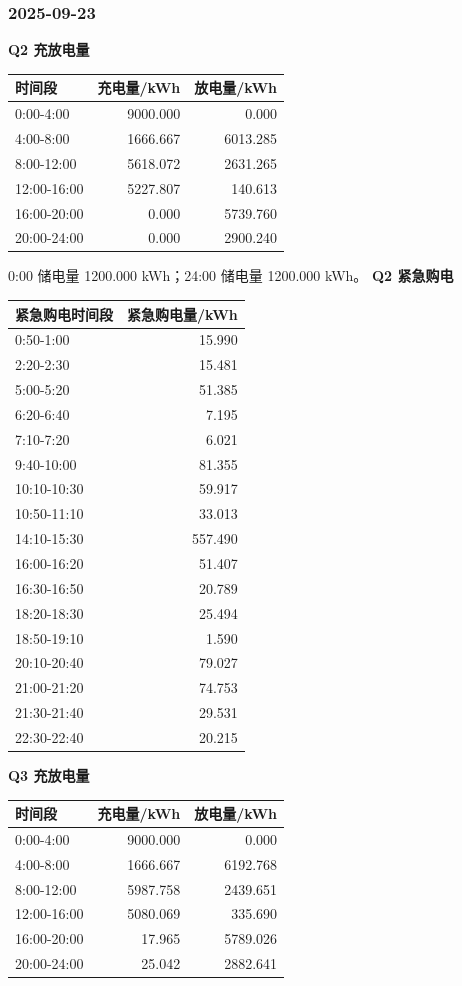 \subsubsection{2025-09-23}
\textbf{Q2 充放电量}
\begin{longtable}[]{@{}lrr@{}}\toprule 时间段 & 充电量/kWh & 放电量/kWh \\\midrule\endhead
0:00-4:00 & 9000.000 & 0.000 \\
4:00-8:00 & 1666.667 & 6013.285 \\
8:00-12:00 & 5618.072 & 2631.265 \\
12:00-16:00 & 5227.807 & 140.613 \\
16:00-20:00 & 0.000 & 5739.760 \\
20:00-24:00 & 0.000 & 2900.240 \\
\bottomrule\end{longtable}
0:00 储电量 1200.000 kWh；24:00 储电量 1200.000 kWh。
\textbf{Q2 紧急购电}
\begin{longtable}[]{@{}lr@{}}\toprule 紧急购电时间段 & 紧急购电量/kWh \\\midrule\endhead
0:50-1:00 & 15.990 \\
2:20-2:30 & 15.481 \\
5:00-5:20 & 51.385 \\
6:20-6:40 & 7.195 \\
7:10-7:20 & 6.021 \\
9:40-10:00 & 81.355 \\
10:10-10:30 & 59.917 \\
10:50-11:10 & 33.013 \\
14:10-15:30 & 557.490 \\
16:00-16:20 & 51.407 \\
16:30-16:50 & 20.789 \\
18:20-18:30 & 25.494 \\
18:50-19:10 & 1.590 \\
20:10-20:40 & 79.027 \\
21:00-21:20 & 74.753 \\
21:30-21:40 & 29.531 \\
22:30-22:40 & 20.215 \\
\bottomrule\end{longtable}
\textbf{Q3 充放电量}
\begin{longtable}[]{@{}lrr@{}}\toprule 时间段 & 充电量/kWh & 放电量/kWh \\\midrule\endhead
0:00-4:00 & 9000.000 & 0.000 \\
4:00-8:00 & 1666.667 & 6192.768 \\
8:00-12:00 & 5987.758 & 2439.651 \\
12:00-16:00 & 5080.069 & 335.690 \\
16:00-20:00 & 17.965 & 5789.026 \\
20:00-24:00 & 25.042 & 2882.641 \\
\bottomrule\end{longtable}
